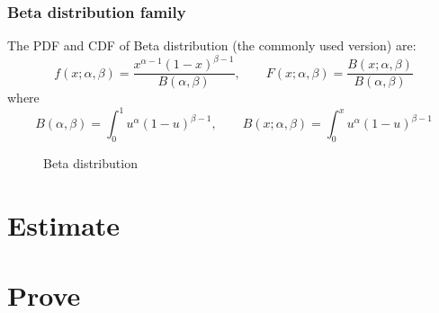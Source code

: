 \documentclass[UTF8]{article} %
\begin{document}
\subsubsection{Beta distribution family}
The PDF and CDF of Beta distribution (the commonly used version)  are:
$$
f(x;\alpha,\beta)=\frac{x^{\alpha-1}(1-x)^{\beta-1}}{B(\alpha,\beta)},
\qquad
F(x;\alpha,\beta)=\frac{B(x;\alpha,\beta)}{B(\alpha,\beta)}
$$
where
$$
B(\alpha,\beta)=\int_0^1u^\alpha (1-u)^{\beta-1},
\qquad
B(x;\alpha,\beta)=\int_0^xu^\alpha (1-u)^{\beta-1}
$$
\begin{figure}[htb]
\centering
{}
\caption{Beta distribution}
\end{figure}


\section{Estimate}

\section{Prove}
\end{document}
